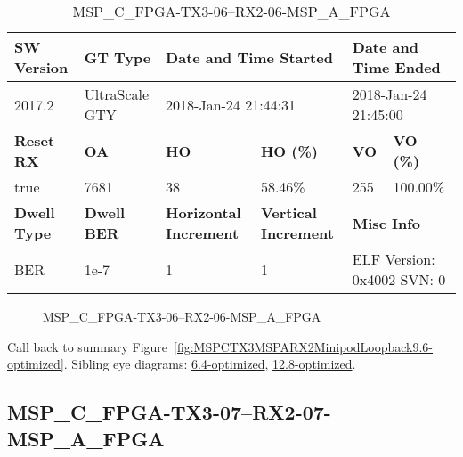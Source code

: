 \begin{table}[h]
\centering
\caption{MSP\_C\_FPGA-TX3-06--RX2-06-MSP\_A\_FPGA}
\label{tab:MSPCFPGATX306RX206MSPAFPGA9.6-optimized}
\begin{tabular}{@{}|l|l|l|l|l|l|@{}}
\toprule
\textbf{SW Version}                & \textbf{GT Type}   & \multicolumn{2}{l|}{\textbf{Date and Time Started}}            & \multicolumn{2}{l|}{\textbf{Date and Time Ended}}        \\ \midrule
2017.2                       & UltraScale GTY          & \multicolumn{2}{l|}{2018-Jan-24 21:44:31}                   & \multicolumn{2}{l|}{2018-Jan-24 21:45:00}               \\ \midrule
\textbf{Reset RX}                  & \textbf{OA} & \textbf{HO}   & \textbf{HO (\%)} & \textbf{VO} & \textbf{VO (\%)} \\ \midrule
true & 7681        & 38          & 58.46\%        & 255        & 100.00\%       \\ \midrule
\textbf{Dwell Type}                & \textbf{Dwell BER} & \textbf{Horizontal Increment} & \textbf{Vertical Increment}    & \multicolumn{2}{l|}{\textbf{Misc Info}}                  \\ \midrule
BER                            & 1e-7        & 1        & 1           & \multicolumn{2}{l|}{ELF Version: 0x4002 SVN: 0}                         \\ \bottomrule
\end{tabular}
\end{table}

\begin{figure}[h]
\caption{MSP\_C\_FPGA-TX3-06--RX2-06-MSP\_A\_FPGA} \label{fig:MSPCFPGATX306RX206MSPAFPGA9.6-optimized}
\end{figure}

Call back to summary Figure~\ref{fig:MSPCTX3MSPARX2MinipodLoopback9.6-optimized}.
Sibling eye diagrams: \hyperref[sec:MSPCFPGATX306RX206MSPAFPGA6.4-optimized]{6.4-optimized}, \hyperref[sec:MSPCFPGATX306RX206MSPAFPGA12.8-optimized]{12.8-optimized}.

\clearpage
\newpage


\subsection{MSP\_C\_FPGA-TX3-07--RX2-07-MSP\_A\_FPGA}\label{sec:MSPCFPGATX307RX207MSPAFPGA9.6-optimized}

